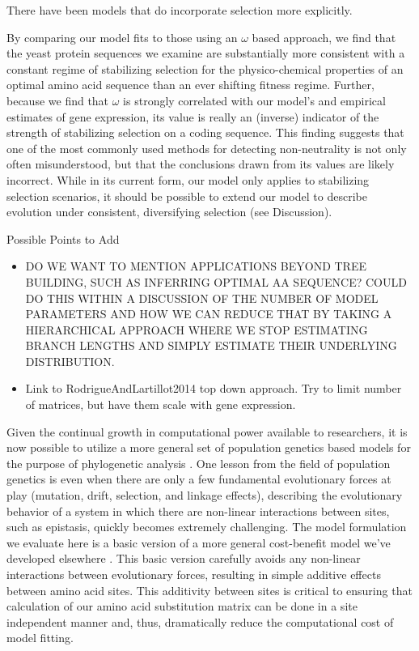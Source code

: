 \documentclass[12pt,letterpaper]{article}
\begin{document}
{There have been models that do incorporate selection more explicitly.


By comparing our model fits to those using an $\omega$ based approach, we find that the yeast protein sequences we examine are substantially more consistent with a constant regime of stabilizing selection for the physico-chemical properties of an optimal amino acid sequence than an ever shifting fitness regime.
Further, because we find that $\omega$ is strongly correlated with our model's and empirical estimates of  gene expression, its value is really an (inverse) indicator of the strength of stabilizing selection on a coding sequence.
This finding suggests that one of the most commonly used methods for detecting non-neutrality is not only often misunderstood, but that the conclusions drawn from its values are likely incorrect.
While in its current form, our model only applies to stabilizing selection scenarios, it should be possible to extend our model to describe evolution under consistent, diversifying selection (see Discussion). %


Possible Points to Add
\begin{itemize}
    \item DO WE WANT TO MENTION APPLICATIONS BEYOND TREE BUILDING, SUCH AS INFERRING OPTIMAL AA SEQUENCE?
    COULD DO THIS WITHIN A DISCUSSION OF THE NUMBER OF MODEL PARAMETERS AND HOW WE CAN REDUCE THAT BY TAKING A HIERARCHICAL APPROACH WHERE WE STOP ESTIMATING BRANCH LENGTHS AND SIMPLY ESTIMATE THEIR UNDERLYING DISTRIBUTION.
\item Link to RodrigueAndLartillot2014 top down approach.
    Try to limit number of matrices, but have them scale with gene expression.
\end{itemize}
Given the continual growth in computational power available to researchers, it is now possible to utilize a more general set of population genetics based models for the purpose of phylogenetic analysis \citep[e.g.~][]{HalpernAndBruno1998,RobinsonEtAl2003,LartillotAndPhilippe2004,RodrigueAndLartillot2014}.
One lesson from the field of population genetics is even when there are only a few fundamental evolutionary forces at play (mutation, drift, selection, and linkage effects), describing the evolutionary behavior of a system in which there are non-linear interactions between sites, such as epistasis, quickly becomes extremely challenging.
The model formulation we evaluate here is a basic version of a more general cost-benefit model we've developed elsewhere \citep{Gilchrist2007,GilchristEtAl2009,ShahAndGilchrist2011,GilchristEtAl2015}.
This basic version carefully avoids any non-linear interactions between evolutionary forces, resulting in simple additive effects between amino acid sites.
This additivity between sites is critical to ensuring that calculation of our amino acid substitution matrix can be done in a site independent manner and, thus, dramatically reduce the computational cost of model fitting.

}
\end{document}
